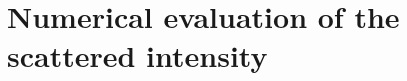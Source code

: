 \documentclass[11pt,letter]{article}
\newcommand{\bv}[1]{\ensuremath{\bm{#1}}}
\newcommand{\dsig}[1]{\ensuremath{ \frac{ d\,\sigma_{#1} }{d\,\Omega} }}
\begin{document}

\section{Numerical evaluation of the scattered intensity}
\end{document}
